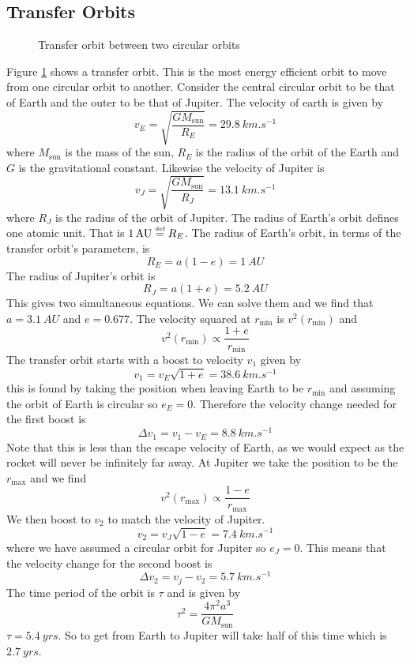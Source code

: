\documentclass{article}
\newcommand{\defeq}{\overset{\text{\tiny def}}{=}}
\begin{document}
    \subsection{Transfer Orbits}
    \begin{figure}[ht]
        \centering
        \caption{Transfer orbit between two circular orbits}
        \label{fig:transfer orbit}
    \end{figure}
    Figure \ref{fig:transfer orbit} shows a transfer orbit.
    This is the most energy efficient orbit to move from one circular orbit to another.
    Consider the central circular orbit to be that of Earth and the outer to be that of Jupiter.
    The velocity of earth is given by
    \[v_E = \sqrt{\frac{GM_\text{sun}}{R_E}} = \SI{29.8}{km.s^{-1}}\]
    where \(M_\text{sun}\) is the mass of the sun, \(R_E\) is the radius of the orbit of the Earth and \(G\) is the gravitational constant.
    Likewise the velocity of Jupiter is
    \[v_J = \sqrt{\frac{GM_\text{sun}}{R_J}} = \SI{13.1}{km.s^{-1}}\]
    where \(R_J\) is the radius of the orbit of Jupiter.
    The radius of Earth's orbit defines one atomic unit.
    That is \(\SI{1}{AU}\defeq R_E\).
    The radius of Earth's orbit, in terms of the transfer orbit's parameters, is
    \[R_E = a(1 - e) = \SI{1}{AU}\]
    The radius of Jupiter's orbit is
    \[R_J = a(1 + e) = \SI{5.2}{AU}\]
    This gives two simultaneous equations.
    We can solve them and we find that \(a = \SI{3.1}{AU}\) and \(e = 0.677\).
    The velocity squared at \(r_\text{min}\) is \(v^2(r_\text{min})\) and
    \[v^2(r_\text{min}) \propto \frac{1 + e}{r_\text{min}}\]
    The transfer orbit starts with a boost to velocity \(v_1\) given by
    \[v_1 = v_E\sqrt{1 + e} = \SI{38.6}{km.s^{-1}}\]
    this is found by taking the position when leaving Earth to be \(r_\text{min}\) and assuming the orbit of Earth is circular so \(e_E = 0\).
    Therefore the velocity change needed for the first boost is
    \[\Delta v_1 = v_1 - v_E = \SI{8.8}{km.s^{-1}}\]
    Note that this is less than the escape velocity of Earth, as we would expect as the rocket will never be infinitely far away.
    At Jupiter we take the position to be the \(r_\text{max}\) and we find
    \[v^2(r_\text{max}) \propto \frac{1 - e}{r_\text{max}}\]
    We then boost to \(v_2\) to match the velocity of Jupiter.
    \[v_2 = v_J\sqrt{1 - e} = \SI{7.4}{km.s^{-1}}\]
    where we have assumed a circular orbit for Jupiter so \(e_J = 0\).
    This means that the velocity change for the second boost is
    \[\Delta v_2 = v_j - v_2 = \SI{5.7}{km.s^{-1}}\]
    The time period of the orbit is \(\tau\) and is given by
    \[\tau^2 = \frac{4\pi^2a^3}{GM_\text{sun}}\]
    \(\tau = \SI{5.4}{yrs}\).
    So to get from Earth to Jupiter will take half of this time which is \(\SI{2.7}{yrs}\).
    
\end{document}
